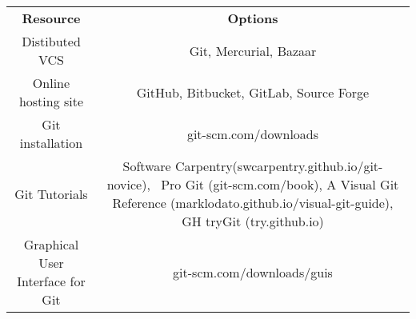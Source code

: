 \begin{tabular}{ c c }
    \textbf{Resource} & \textbf{Options} \\ 
    Distibuted VCS & Git, Mercurial, Bazaar \\ 
    Online hosting site & GitHub, Bitbucket, GitLab, Source Forge \\ 
    Git installation & git-scm.com/downloads \\ 
    Git Tutorials & Software Carpentry(swcarpentry.github.io/git-novice),  Pro Git (git-scm.com/book), A Visual Git Reference (marklodato.github.io/visual-git-guide), GH tryGit (try.github.io) \\ 
    Graphical User Interface for Git & git-scm.com/downloads/guis \\ 
\end{tabular}